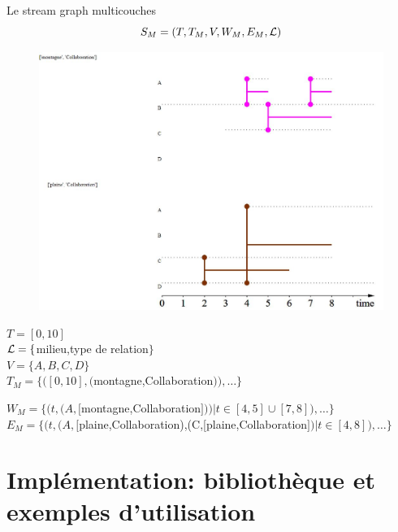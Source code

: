 \documentclass[15pt]{beamer}
\def \stgm {stream graph multicouches}
\begin{document}
\begin{frame}{Le \stgm{}}
	\[
		S_M=(T,T_M,V,W_M,E_M,\cal{L})
	\]
	\begin{minipage}{0.59\linewidth}
		\begin{figure}
    		\centering
    		\includegraphics[width=\linewidth]{img/exMultiStream.JPG}
		\end{figure}
	\end{minipage}
	\begin{minipage}{0.4\textwidth}
		\begin{footnotesize}
			$T=[0,10]$\\ \pause
			${\cal L} = \{$milieu,type de relation$\}$\\ \pause
			$V=\{A,B,C,D\}$\\ \pause
			$T_M= \{([0,10],($montagne,Collaboration$)), \dots \}$\pause
		\end{footnotesize}
	\end{minipage}

	\begin{footnotesize}
		$W_M = \{ (t,(A,[$montagne,Collaboration$]))| t \in [4,5]\cup[7,8]), \dots \}$ \pause
		\\
		$E_M= \{ (t,(A,[$plaine,Collaboration),(C,[plaine,Collaboration$])| t \in [4,8]), \dots \}$
	\end{footnotesize}
\end{frame}

\section{Implémentation: bibliothèque et exemples d'utilisation}
\end{document}
